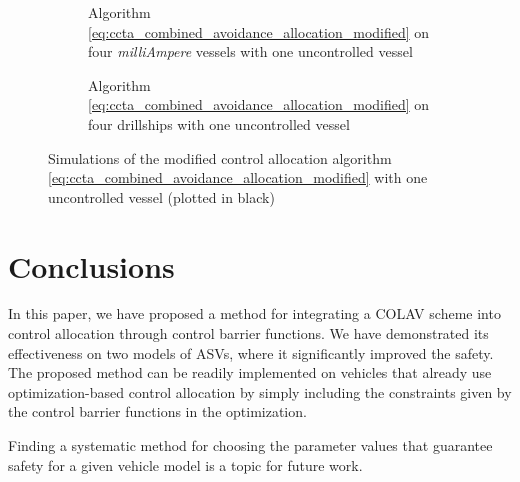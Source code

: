 \begin{figure}[t]
    \centering
    \begin{subfigure}{\linewidth}
        \centering
        
        \caption{Algorithm \eqref{eq:ccta_combined_avoidance_allocation_modified} on four \emph{milliAmpere} vessels with one uncontrolled vessel}
        \vspace{0em}
    \end{subfigure}
    \begin{subfigure}{\linewidth}
        \centering
        
        \caption{Algorithm \eqref{eq:ccta_combined_avoidance_allocation_modified} on four drillships with one uncontrolled vessel}
        \label{fig:ccta_drillship_unc}
        \vspace{-1.5mm}
    \end{subfigure}
    \caption{Simulations of the modified control allocation algorithm \eqref{eq:ccta_combined_avoidance_allocation_modified} with one uncontrolled vessel (plotted in black)}
    \label{fig:ccta_uncontrolled}
    \vspace{-6mm}
\end{figure}

\section{Conclusions}
\label{sec:ccta_conclusion}
In this paper, we have proposed a method for integrating a COLAV scheme into control allocation through control barrier functions.
We have demonstrated its effectiveness on two models of ASVs, where it significantly improved the safety.
The proposed method can be readily implemented on vehicles that already use optimization-based control allocation by simply including the constraints given by the control barrier functions in the optimization.

Finding a systematic method for choosing the parameter values that guarantee safety for a given vehicle model is a topic for future work.
